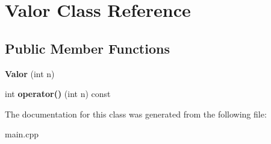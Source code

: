 \hypertarget{classValor}{}\section{Valor Class Reference}
\label{classValor}
\subsection*{Public Member Functions}
\begin{DoxyCompactItemize}
\item 
\mbox{\label{classValor_a4eb28be79d4949ad23689cfd54b1280b}} 
{\bfseries Valor} (int n)
\item 
\mbox{\label{classValor_ac551df79f899b15928630c8c10ad4a5b}} 
int {\bfseries operator()} (int n) const
\end{DoxyCompactItemize}


The documentation for this class was generated from the following file\+:\begin{DoxyCompactItemize}
\item 
main.\+cpp\end{DoxyCompactItemize}
